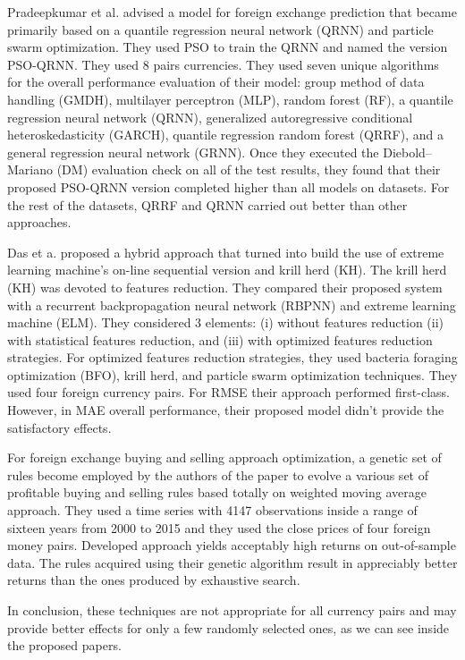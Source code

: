 Pradeepkumar et al. \cite{Pradeepkumar17} advised a model for foreign exchange prediction that became primarily based on a quantile regression neural network (QRNN) and particle swarm optimization. They used PSO to train the QRNN and named the version PSO-QRNN. They used 8 pairs currencies. They used seven unique algorithms for the overall performance evaluation of their model: group method of data handling (GMDH), multilayer perceptron (MLP), random forest (RF), a quantile regression neural network (QRNN), generalized autoregressive conditional heteroskedasticity (GARCH), quantile regression random forest (QRRF), and a general regression neural network (GRNN). Once they executed the Diebold–Mariano (DM) evaluation check on all of the test results, they found that their proposed PSO-QRNN version completed higher than all models on  datasets. For the rest of the datasets, QRRF and QRNN carried out better than other approaches.

Das et a. \cite{Das19} proposed a hybrid approach that turned into build the use of extreme learning machine's on-line sequential version and krill herd (KH). The krill herd (KH) was devoted to features reduction. They compared their proposed system with a recurrent backpropagation neural network (RBPNN) and extreme learning machine (ELM). They considered 3 elements: (i) without features reduction (ii) with statistical features reduction, and (iii) with optimized features reduction strategies. For optimized features reduction strategies, they used bacteria foraging optimization (BFO), krill herd, and particle swarm optimization techniques. They used four foreign currency pairs. For RMSE their approach performed first-class. However, in MAE overall performance, their proposed model didn't provide the satisfactory effects.

For foreign exchange buying and selling approach optimization, a genetic set of rules become employed by the authors of the paper  \cite{Galeshchuk17} to evolve a various set of profitable buying and selling rules based totally on weighted moving average approach. They used a time series with 4147 observations inside a range of sixteen years from 2000 to 2015 and they used the close prices of four foreign money pairs. Developed approach yields acceptably high returns on out-of-sample data. The rules acquired using their genetic algorithm result in appreciably better returns than the ones produced by exhaustive search.

In conclusion, these techniques are not appropriate for all currency pairs and may provide better effects for only a few randomly selected ones, as we can see inside the proposed papers.

